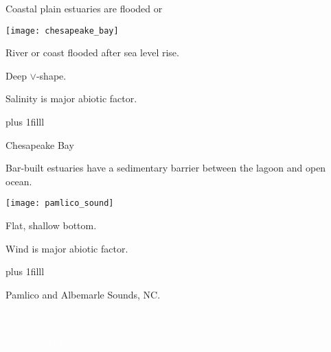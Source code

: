 \documentclass[t]{beamer}
\begin{document}
%
\begin{frame}[t]{Coastal plain estuaries are flooded or }
	
	\vspace*{-\baselineskip}
	
	\begin{multicols}{2}
		\begin{center}
			\texttt{[image: chesapeake\_bay]}
		\end{center}
	\columnbreak
	
		\hangpara River or coast flooded after sea level rise.
		
		\hangpara Deep $\vee$-shape.
		
		\hangpara Salinity is major abiotic factor.
		
		
	\end{multicols}

	\vskip0pt plus 1filll

	\tiny Chesapeake Bay
\end{frame}
%
\begin{frame}[t]{Bar-built estuaries have a sedimentary barrier between the lagoon and open ocean.}
	
	\vspace*{-\baselineskip}
	
	\begin{multicols}{2}
		\begin{center}
			\texttt{[image: pamlico\_sound]}
		\end{center}
	\columnbreak
	
		\hangpara Flat, shallow bottom.
		
		\hangpara Wind is major abiotic factor.
		
	\end{multicols}

	\vskip0pt plus 1filll

	\tiny Pamlico and Albemarle Sounds, NC.
\end{frame}
%
%
{
\begin{frame}[b]{}
\tiny\textcolor{white}{Google Earth.}
\end{frame}
}
%
{
\begin{frame}[b]{}
\tiny\textcolor{white}{Google Earth.}
\end{frame}
}
%
\end{document}
